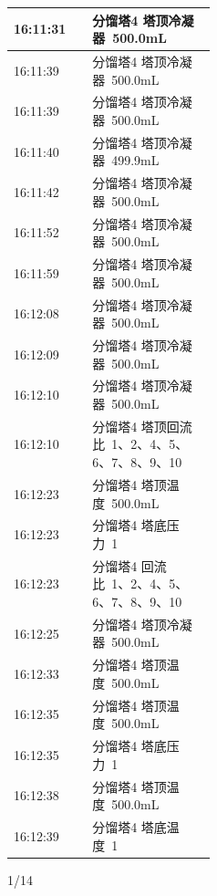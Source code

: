 \documentclass[UTF8,10pt,a4paper,fontset=fandol]{ctexart}
\newcommand{\handwritten}[1]{#1}
\begin{document}
\begin{center}
\begin{tabular}{|p{0.12\linewidth}|p{0.32\linewidth}|}
16:11:31 & 分馏塔4 塔顶冷凝器~500.0mL\\ \hline
16:11:39 & 分馏塔4 塔顶冷凝器~500.0mL\\ \hline
16:11:39 & 分馏塔4 塔顶冷凝器~500.0mL\\ \hline
16:11:40 & 分馏塔4 塔顶冷凝器~499.9mL\\ \hline
16:11:42 & 分馏塔4 塔顶冷凝器~500.0mL\\ \hline
16:11:52 & 分馏塔4 塔顶冷凝器~500.0mL\\ \hline
16:11:59 & 分馏塔4 塔顶冷凝器~500.0mL\\ \hline
16:12:08 & 分馏塔4 塔顶冷凝器~500.0mL\\ \hline
16:12:09 & 分馏塔4 塔顶冷凝器~500.0mL\\ \hline
16:12:10 & 分馏塔4 塔顶冷凝器~500.0mL\\ \hline
16:12:10 & 分馏塔4 塔顶回流比~1、2、4、5、6、7、8、9、10\\ \hline
16:12:23 & 分馏塔4 塔顶温度~500.0mL\\ \hline
16:12:23 & 分馏塔4 塔底压力~1\\ \hline
16:12:23 & 分馏塔4 回流比~1、2、4、5、6、7、8、9、10\\ \hline
16:12:25 & 分馏塔4 塔顶冷凝器~500.0mL\\ \hline
16:12:33 & 分馏塔4 塔顶温度~500.0mL\\ \hline
16:12:35 & 分馏塔4 塔顶温度~500.0mL\\ \hline
16:12:35 & 分馏塔4 塔底压力~1\\ \hline
16:12:38 & 分馏塔4 塔顶温度~500.0mL\\ \hline
16:12:39 & 分馏塔4 塔底温度~1\\ \hline
\end{tabular}
\end{center}

\handwritten{1/14}

\newpage
\end{document}
